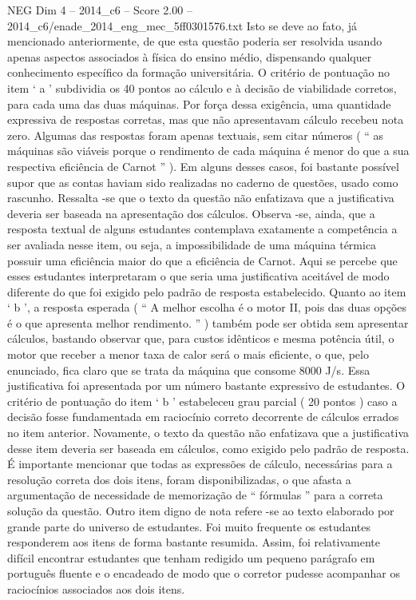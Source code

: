 \begin{textsample}{NEG Dim 4 – 2014\_c6 – Score 2.00 – 2014\_c6/enade\_2014\_eng\_mec\_5ff0301576.txt}
Isto se deve ao fato, já mencionado anteriormente, de que esta questão poderia ser resolvida usando apenas aspectos associados à física do ensino médio, dispensando qualquer conhecimento específico da formação universitária.
O critério de pontuação no item ‘ a ’ subdividia os 40 pontos ao cálculo e à decisão de viabilidade corretos, para cada uma das duas máquinas.
Por força dessa exigência, uma quantidade expressiva de respostas corretas, mas que não apresentavam cálculo recebeu nota zero.
Algumas das respostas foram apenas textuais, sem citar números ( “ as máquinas são viáveis porque o rendimento de cada máquina é menor do que a sua respectiva eficiência de Carnot ” ).
Em alguns desses casos, foi bastante possível supor que as contas haviam sido realizadas no caderno de questões, usado como rascunho.
Ressalta -se que o texto da questão não enfatizava que a justificativa deveria ser baseada na apresentação dos cálculos.
Observa -se, ainda, que a resposta textual de alguns estudantes contemplava exatamente a competência a ser avaliada nesse item, ou seja, a impossibilidade de uma máquina térmica possuir uma eficiência maior do que a eficiência de Carnot.
Aqui se percebe que esses estudantes interpretaram o que seria uma justificativa aceitável de modo diferente do que foi exigido pelo padrão de resposta estabelecido.
Quanto ao item ‘ b ’, a resposta esperada ( “ A melhor escolha é o motor II, pois das duas opções é o que apresenta melhor rendimento. ” ) também pode ser obtida sem apresentar cálculos, bastando observar que, para custos idênticos e mesma potência útil, o motor que receber a menor taxa de calor será o mais eficiente, o que, pelo enunciado, fica claro que se trata da máquina que consome 8000 J/s.
Essa justificativa foi apresentada por um número bastante expressivo de estudantes.
O critério de pontuação do item ‘ b ’ estabeleceu grau parcial ( 20 pontos ) caso a decisão fosse fundamentada em raciocínio correto decorrente de cálculos errados no item anterior.
Novamente, o texto da questão não enfatizava que a justificativa desse item deveria ser baseada em cálculos, como exigido pelo padrão de resposta.
É importante mencionar que todas as expressões de cálculo, necessárias para a resolução correta dos dois itens, foram disponibilizadas, o que afasta a argumentação de necessidade de memorização de “ fórmulas ” para a correta solução da questão.
Outro item digno de nota refere -se ao texto elaborado por grande parte do universo de estudantes.
Foi muito frequente os estudantes responderem aos itens de forma bastante resumida.
Assim, foi relativamente difícil encontrar estudantes que tenham redigido um pequeno parágrafo em português fluente e o encadeado de modo que o corretor pudesse acompanhar os raciocínios associados aos dois itens.

\end{textsample}
